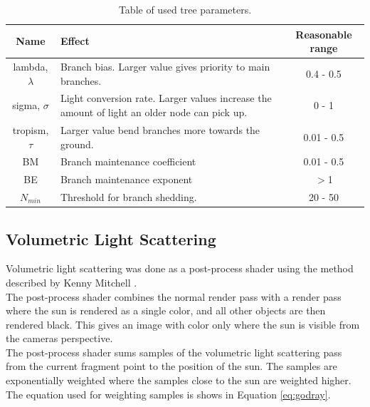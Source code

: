\documentclass{article}
\begin{document}
	  		\begin{table} [!h]
	  			\begin{center}
	  				\caption{Table of used tree parameters.}
	  				\begin{tabular}{ | c | m{6.5cm} | c | } 
	  					\hline
	  					Name & Effect & Reasonable range \\
	  					\hline
	  					\hline
	  					lambda, $\lambda$ & Branch bias. Larger value gives priority to main branches. & 0.4 - 0.5 \\ 
	  					\hline
	  					sigma, $\sigma$ & Light conversion rate. Larger values increase the amount of light an older node can pick up. & 0 - 1\\ 
	  					\hline
	  					tropism, $\tau$ & Larger value bend branches more towards the ground. & 0.01 - 0.5 \\ 
	  					\hline
	  					BM & Branch maintenance coefficient & 0.01 - 0.5 \\ 
	  					\hline
	  					BE & Branch maintenance exponent &  $>$1\\ 
	  					\hline
	  					$N_{min}$ & Threshold for branch shedding. & 20 - 50 \\ 
	  					\hline
	  				\end{tabular}
	  				
	  				\label{table:param}
	  			\end{center}
	  		\end{table}
  			
  		\subsection{Volumetric Light Scattering}
  		
  			Volumetric light scattering was done as a post-process shader using the method described by Kenny Mitchell \citep{mitchell}. \\
  			
  			The post-process shader combines the normal render pass with a render pass where the sun is rendered as a single color, and all other objects are then rendered black. This gives an image with color only where the sun is visible from the cameras perspective. \\
  			
  			The post-process shader sums samples of the volumetric light scattering pass from the current fragment point to the position of the sun. The samples are exponentially weighted where the samples close to the sun are weighted higher. The equation used for weighting samples is shows in Equation \ref{eq:godray}. 
  			
\end{document}
